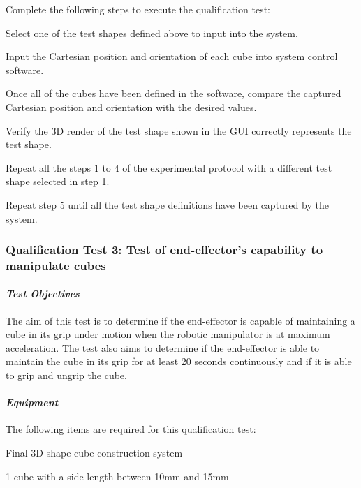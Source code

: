 Complete the following steps to execute the qualification test:

\begin{compactenum}
	\item Select one of the test shapes defined above to input into the system.
	\item Input the Cartesian position and orientation of each cube into system control software.
	\item Once all of the cubes have been defined in the software, compare the captured Cartesian position and orientation with the desired values.
	\item Verify the 3D render of the test shape shown in the GUI correctly represents the test shape.
	\item Repeat all the steps 1 to 4 of the experimental protocol with a different test shape selected in step 1.
	\item Repeat step 5 until all the test shape definitions have been captured by the system.
\end{compactenum}

\subsubsection{Qualification Test 3: Test of end-effector's capability to manipulate cubes}

\paragraph{\textit{Test Objectives}}

The aim of this test is to determine if the end-effector is capable of maintaining a cube in its grip under motion when the robotic manipulator is at maximum acceleration. The test also aims to determine if the end-effector is able to maintain the cube in its grip for at least 20 seconds continuously and if it is able to grip and ungrip the cube.

\paragraph{\textit{Equipment}}

The following items are required for this qualification test:

\begin{compactitem}
	\item Final 3D shape cube construction system
	\item 1 cube with a side length between 10mm and 15mm
\end{compactitem}

